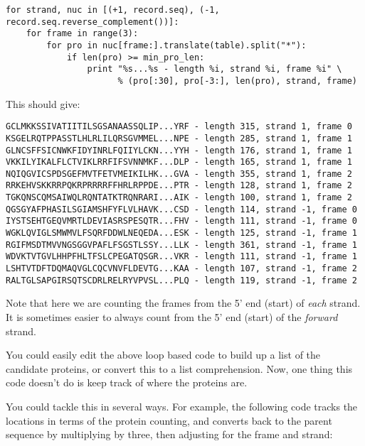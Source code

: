 \documentclass{report}
\begin{document}
\begin{verbatim}
for strand, nuc in [(+1, record.seq), (-1, record.seq.reverse_complement())]:
    for frame in range(3):
        for pro in nuc[frame:].translate(table).split("*"):
            if len(pro) >= min_pro_len:
                print "%s...%s - length %i, strand %i, frame %i" \
                      % (pro[:30], pro[-3:], len(pro), strand, frame)
\end{verbatim}

\noindent This should give:

\begin{verbatim}
GCLMKKSSIVATIITILSGSANAASSQLIP...YRF - length 315, strand 1, frame 0
KSGELRQTPPASSTLHLRLILQRSGVMMEL...NPE - length 285, strand 1, frame 1
GLNCSFFSICNWKFIDYINRLFQIIYLCKN...YYH - length 176, strand 1, frame 1
VKKILYIKALFLCTVIKLRRFIFSVNNMKF...DLP - length 165, strand 1, frame 1
NQIQGVICSPDSGEFMVTFETVMEIKILHK...GVA - length 355, strand 1, frame 2
RRKEHVSKKRRPQKRPRRRRFFHRLRPPDE...PTR - length 128, strand 1, frame 2
TGKQNSCQMSAIWQLRQNTATKTRQNRARI...AIK - length 100, strand 1, frame 2
QGSGYAFPHASILSGIAMSHFYFLVLHAVK...CSD - length 114, strand -1, frame 0
IYSTSEHTGEQVMRTLDEVIASRSPESQTR...FHV - length 111, strand -1, frame 0
WGKLQVIGLSMWMVLFSQRFDDWLNEQEDA...ESK - length 125, strand -1, frame 1
RGIFMSDTMVVNGSGGVPAFLFSGSTLSSY...LLK - length 361, strand -1, frame 1
WDVKTVTGVLHHPFHLTFSLCPEGATQSGR...VKR - length 111, strand -1, frame 1
LSHTVTDFTDQMAQVGLCQCVNVFLDEVTG...KAA - length 107, strand -1, frame 2
RALTGLSAPGIRSQTSCDRLRELRYVPVSL...PLQ - length 119, strand -1, frame 2
\end{verbatim}

Note that here we are counting the frames from the 5' end (start) of
\emph{each} strand. It is sometimes easier to always count from the 5' end
(start) of the \emph{forward} strand.

You could easily edit the above loop based code to build up a list of the
candidate proteins, or convert this to a list comprehension.  Now, one thing
this code doesn't do is keep track of where the proteins are.

You could tackle this in several ways.  For example, the following code tracks
the locations in terms of the protein counting, and converts back to the
parent sequence by multiplying by three, then adjusting for the frame and
strand:
\end{document}
